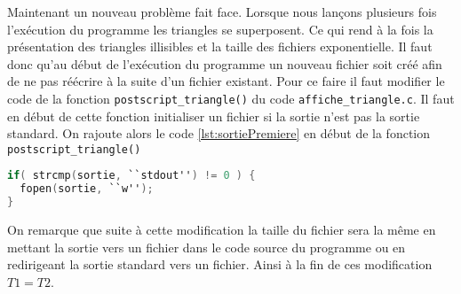 Maintenant un nouveau problème fait face.
Lorsque nous lançons plusieurs fois l'exécution du programme les triangles se superposent.
Ce qui rend à la fois la présentation des triangles illisibles et la taille des fichiers exponentielle.
Il faut donc qu'au début de l'exécution du programme un nouveau fichier soit créé afin de ne pas réécrire à la suite d'un fichier existant.
Pour ce faire il faut modifier le code de la fonction \verb!postscript_triangle()! du code \verb!affiche_triangle.c!.
Il faut en début de cette fonction initialiser un fichier si la sortie n'est pas la sortie standard.
On rajoute alors le code \ref{lst:sortiePremiere} en début de la fonction \verb!postscript_triangle()!

\begin{lstlisting}[language=C, label={lst:sortiePremiere}, caption={Initialisation du fichier de sortie.}]
if( strcmp(sortie, ``stdout'') != 0 ) {
  fopen(sortie, ``w'');
}
\end{lstlisting}

On remarque que suite à cette modification la taille du fichier sera la même en mettant la sortie vers un fichier dans le code source du programme ou en redirigeant la sortie standard vers un fichier.
Ainsi à la fin de ces modification $T1=T2$.

